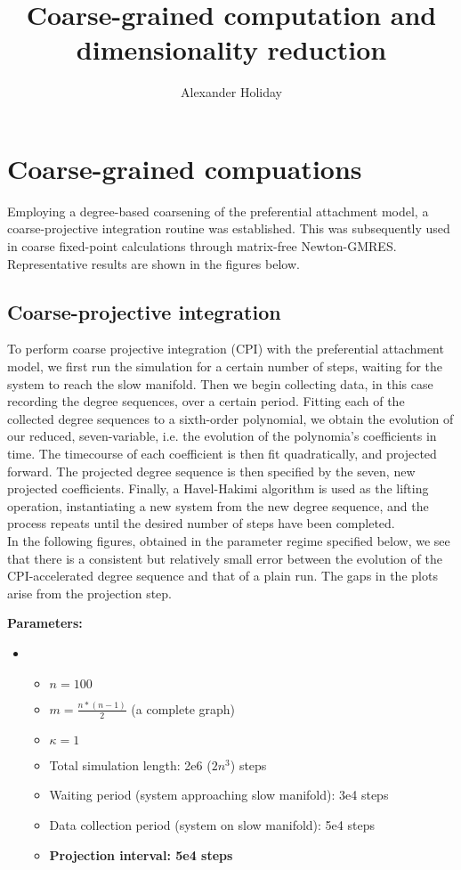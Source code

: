 \documentclass[11pt]{article}
\begin{document}
\title{\vspace{-10mm}Coarse-grained computation and dimensionality reduction}
\author{Alexander Holiday}
\maketitle

\section{Coarse-grained compuations}

Employing a degree-based coarsening of the preferential attachment model, a coarse-projective integration routine was established. This was subsequently used in coarse fixed-point calculations through matrix-free Newton-GMRES. Representative results are shown in the figures below.

\subsection{Coarse-projective integration}

To perform coarse projective integration (CPI) with the preferential attachment model, we first run the simulation for a certain number of steps, waiting for the system to reach the slow manifold. Then we begin collecting data, in this case recording the degree sequences, over a certain period. Fitting each of the collected degree sequences to a sixth-order polynomial, we obtain the evolution of our reduced, seven-variable, i.e. the evolution of the polynomia's coefficients in time. The timecourse of each coefficient is then fit quadratically, and projected forward. The projected degree sequence is then specified by the seven, new projected coefficients. Finally, a Havel-Hakimi algorithm is used as the lifting operation, instantiating a new system from the new degree sequence, and the process repeats until the desired number of steps have been completed. \\

In the following figures, obtained in the parameter regime specified below, we see that there is a consistent but relatively small error between the evolution of the CPI-accelerated degree sequence and that of a plain run. The gaps in the plots arise from the projection step.

\textbf{Parameters:}
\begin{itemize}[label=]
\item \begin{itemize}[label=-]
\item $n=100$
  \item $m=\frac{n*(n-1)}{2}$ (a complete graph)
  \item $\kappa=1$
  \item Total simulation length: 2e6 ($2n^3$) steps
  \item Waiting period (system approaching slow manifold): 3e4 steps
  \item Data collection period (system on slow manifold): 5e4 steps
  \item  \textbf{Projection interval: 5e4 steps}
\end{itemize}
\end{itemize}
\end{document}
